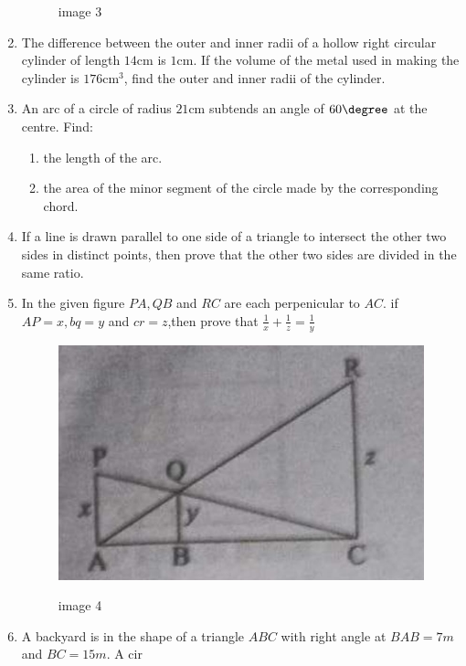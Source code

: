 \begin{enumerate}
\begin{figure}[!ht]
\label{fig:Image 3}
\caption{image 3}
\end{figure}                                                                                                
\item The difference between the outer and inner radii of a hollow right circular cylinder of length $14\mathrm{cm}$ is $1\mathrm{cm}$. If the volume of the metal used in making the cylinder is $176\mathrm{cm}^3$, find the outer and inner radii of the cylinder.  
\item An arc of a circle of radius $21\mathrm{cm}$ subtends an angle of $60\degree$ at the centre. Find:
\begin{enumerate}                                                                                       
\item the length of the arc.
\item the area of the minor segment of the circle made by the corresponding chord.
\end{enumerate}  
\item If a line is drawn parallel to one side of a triangle to intersect the other two sides in distinct points, then prove that the other two sides are divided in the same ratio. 
\item In the given figure $PA,QB$ and $RC$ are each perpenicular to $AC$. if $AP = x,bq=y$ and $cr =z$,then
prove that $\frac{1}{x} + \frac{1}{z} = \frac{1}{y}$ 
\newpage
\begin{figure}[!ht]
\centering
\includegraphics[width=\columnwidth]{figs/g4.jpg}   
\label{fig:image 4}
\caption{image 4}
\end{figure}
\item A backyard is in the shape of a triangle $ABC$ with right angle at $B AB = 7 m$ and $BC = 15 m$. A cir

\end{enumerate}
